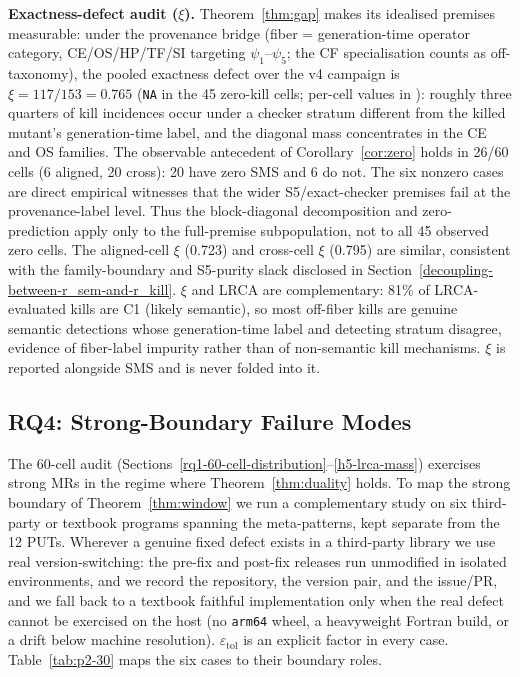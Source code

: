 \documentclass[review,12pt,authoryear]{elsarticle}
\begin{document}
\textbf{Exactness-defect audit ($\xi$).} Theorem~\ref{thm:gap} makes
its idealised premises measurable: under the provenance bridge (fiber =
generation-time operator category, CE/OS/HP/TF/SI targeting
$\psi_1$--$\psi_5$; the CF specialisation counts as off-taxonomy), the
pooled exactness defect over the v4 campaign is
$\xi = 117/153 = 0.765$ (\texttt{NA} in the 45 zero-kill cells;
per-cell values in ):
roughly three quarters of kill incidences occur under a checker stratum
different from the killed mutant's generation-time label, and the
diagonal mass concentrates in the CE and OS families. The observable
antecedent of Corollary~\ref{cor:zero} holds in 26/60
cells (6 aligned, 20 cross): 20 have zero SMS and 6 do not. The six
nonzero cases are direct empirical witnesses that the wider
S5/exact-checker premises fail at the provenance-label level. Thus the
block-diagonal decomposition and zero-prediction apply only to the
full-premise subpopulation, not to all 45 observed zero cells. The aligned-cell $\xi$
(0.723) and cross-cell $\xi$ (0.795) are similar, consistent with the
family-boundary and S5-purity slack disclosed in
Section~\ref{decoupling-between-r_sem-and-r_kill}. $\xi$ and LRCA are
complementary: 81\% of LRCA-evaluated kills are C1 (likely semantic),
so most off-fiber kills are genuine semantic detections whose
generation-time label and detecting stratum disagree, evidence of
fiber-label impurity rather than of non-semantic kill mechanisms. $\xi$
is reported alongside SMS and is never folded into it.

\subsection{RQ4: Strong-Boundary Failure Modes}\label{rq4-strong-boundary}

The 60-cell audit (Sections~\ref{rq1-60-cell-distribution}--\ref{h5-lrca-mass}) exercises strong MRs in the regime where
Theorem~\ref{thm:duality} holds. To map the strong boundary of Theorem~\ref{thm:window} we run a
complementary study on six third-party or textbook programs spanning the
meta-patterns, kept separate from the 12 PUTs. Wherever a genuine fixed
defect exists in a third-party library we use real version-switching:
the pre-fix and post-fix releases run unmodified in isolated environments,
and we record the repository, the version pair, and the issue/PR, and
we fall back to a textbook faithful implementation only when the real
defect cannot be exercised on the host (no \texttt{arm64} wheel, a
heavyweight Fortran build, or a drift below machine resolution).
$\varepsilon_{\mathrm{tol}}$ is an explicit factor in every case.
Table~\ref{tab:p2-30} maps the six cases to their boundary roles.
\end{document}
